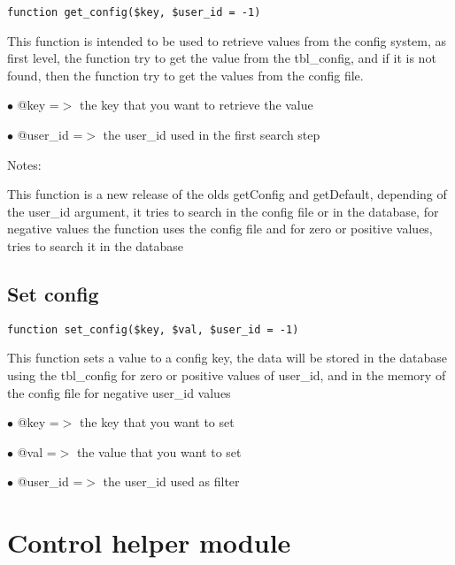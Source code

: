 \documentclass[a4paper]{book}
\begin{document}
\begin{lstlisting}
function get_config($key, $user_id = -1)
\end{lstlisting}

This function is intended to be used to retrieve values from the
config system, as first level, the function try to get the value from
the tbl\_config, and if it is not found, then the function try to get
the values from the config file.

\begin{compactitem}
\item[\color{myblue}$\bullet$] @key     =$>$ the key that you want to retrieve the value
\item[\color{myblue}$\bullet$] @user\_id =$>$ the user\_id used in the first search step
\end{compactitem}

Notes:

This function is a new release of the olds getConfig and getDefault,
depending of the user\_id argument, it tries to search in the config
file or in the database, for negative values the function uses the
config file and for zero or positive values, tries to search it in
the database

\hypertarget{toc56}{}
\subsection{Set config}

\begin{lstlisting}
function set_config($key, $val, $user_id = -1)
\end{lstlisting}

This function sets a value to a config key, the data will be stored in the
database using the tbl\_config for zero or positive values of user\_id, and
in the memory of the config file for negative user\_id values

\begin{compactitem}
\item[\color{myblue}$\bullet$] @key     =$>$ the key that you want to set
\item[\color{myblue}$\bullet$] @val     =$>$ the value that you want to set
\item[\color{myblue}$\bullet$] @user\_id =$>$ the user\_id used as filter
\end{compactitem}

\hypertarget{toc57}{}
\section{Control helper module}
\end{document}
